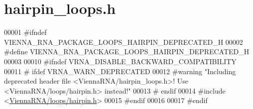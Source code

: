 \hypertarget{hairpin__loops_8h_source}{}\section{hairpin\+\_\+loops.\+h}
\label{hairpin__loops_8h_source}

\begin{DoxyCode}
00001 \textcolor{preprocessor}{#ifndef VIENNA\_RNA\_PACKAGE\_LOOPS\_HAIRPIN\_DEPRECATED\_H}
00002 \textcolor{preprocessor}{#define VIENNA\_RNA\_PACKAGE\_LOOPS\_HAIRPIN\_DEPRECATED\_H}
00003 
00010 \textcolor{preprocessor}{#ifndef VRNA\_DISABLE\_BACKWARD\_COMPATIBILITY}
00011 \textcolor{preprocessor}{# ifdef VRNA\_WARN\_DEPRECATED}
00012 \textcolor{preprocessor}{#warning "Including deprecated header file <ViennaRNA/hairpin\_loops.h>! Use <ViennaRNA/loops/hairpin.h>
       instead!"}
00013 \textcolor{preprocessor}{# endif}
00014 \textcolor{preprocessor}{#include <\hyperlink{hairpin_8h}{ViennaRNA/loops/hairpin.h}>}
00015 \textcolor{preprocessor}{#endif}
00016 
00017 \textcolor{preprocessor}{#endif}
\end{DoxyCode}
